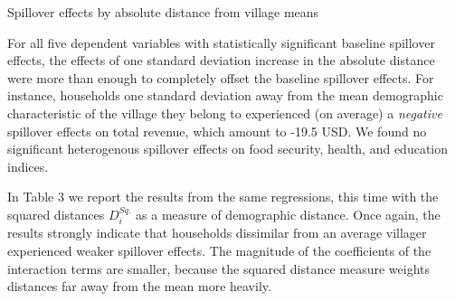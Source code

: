 \documentclass[11pt]{article}
\begin{document}
    \begin{table}[H]
    \centering
    \caption{Spillover effects by absolute distance from village means}
    \end{table}

    For all five dependent variables with statistically significant baseline spillover effects, the effects of one standard deviation increase in the absolute distance were more than enough to completely offset the baseline spillover effects. For instance, households one standard deviation away from the mean demographic characteristic of the village they belong to experienced (on average) a \textit{negative} spillover effects on total revenue, which amount to -19.5 USD. We found no significant heterogenous spillover effects on food security, health, and education indices.

    In Table 3 we report the results from the same regressions, this time with the squared distances $D_i^{Sq.}$ as a measure of demographic distance. Once again, the results strongly indicate that households dissimilar from an average villager experienced weaker spillover effects. The magnitude of the coefficients of the interaction terms are smaller, because the squared distance measure weights distances far away from the mean more heavily.
\end{document}
